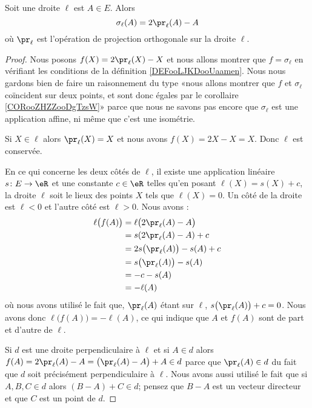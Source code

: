 \begin{lemma}       \label{LEMooZSDRooUkNYer}
    Soit une droite \( \ell\) est \( A\in E\). Alors
    \begin{equation}        \label{EQooVUQDooKuwszl}
        \sigma_{\ell}(A)=2\pr_{\ell}(A)-A
    \end{equation}
    où \( \pr_{\ell}\) est l'opération de projection orthogonale sur la droite \( \ell\).
\end{lemma}

\begin{proof}
    Nous posons \( f(X)=2\pr_{\ell}(X)-X\) et nous allons montrer que \( f=\sigma_{\ell}\) en vérifiant les conditions de la définition \ref{DEFooLJKDooUaamen}. Nous nous gardons bien de faire un raisonnement du type «nous allons montrer que \( f\) et \( \sigma_{\ell}\) coïncident sur deux points, et sont donc égales par le corollaire \ref{CORooZHZZooDgTzsW}» parce que nous ne savons pas encore que \( \sigma_{\ell}\) est une application affine, ni même que c'est une isométrie.

    Si \( X\in\ell\) alors \( \pr_{\ell}(X)=X\) et nous avons \( f(X)=2X-X=X\). Donc \( \ell\) est conservée.

    En ce qui concerne les deux côtés de \( \ell\), il existe une application linéaire \( s\colon E\to \eR\) et une constante \( c\in \eR\) telles qu'en posant \( \ell(X)=s(X)+c\), la droite \( \ell\) soit le lieux des points \( X\) tels que \( \ell(X)=0\). Un côté de la droite est \( \ell<0\) et l'autre côté est \( \ell>0\). Nous avons :
    \begin{subequations}
        \begin{align}
            \ell\big( f(A) \big)&=\ell\big( 2\pr_{\ell}(A)-A \big)\\
            &=s(2\pr_{\ell}(A)-A)+c\\
            &=2s\big( \pr_{\ell}(A) \big)-s(A)+c\\
            &=s\big( \pr_{\ell}(A) \big)-s(A)\\
            &=-c-s(A)\\
            &=-\ell(A)
        \end{align}
    \end{subequations}
    où nous avons utilisé le fait que, \( \pr_{\ell}(A)\) étant sur \( \ell\), \( s\big( \pr_{\ell}(A) \big)+c=0\). Nous avons donc \( \ell\big( f(A) \big)=-\ell(A)\), ce qui indique que \( A\) et \( f(A)\) sont de part et d'autre de \( \ell\).

    Si \( d\) est une droite perpendiculaire à \( \ell\) et si \( A\in d\) alors \( f(A)=2\pr_{\ell}(A)-A=  \big( \pr_{\ell}(A)-A \big)+A\in d  \) parce que \( \pr_{\ell}(A)\in d\) du fait que \( d\) soit précisément perpendiculaire à \( \ell\). Nous avons aussi utilisé le fait que si \( A,B,C\in d\) alors \( (B-A)+C\in d\); pensez que \( B-A\) est un vecteur directeur et que \( C\) est un point de \( d\).


\end{proof}
